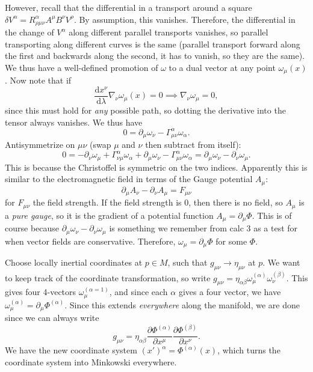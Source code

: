 However, recall that the differential in a transport around a square $\delta V^\alpha =R^\alpha _{\rho \mu \nu } A^\mu B^\nu V^\rho $. By assumption, this vanishes. Therefore, the differential in the change of $V^\alpha $ along different parallel transports vanishes, so parallel transporting along different curves is the same (parallel transport forward along the first and backwards along the second, it has to vanish, so they are the same). We thus have a well-defined promotion of $\omega $ to a dual vector at any point $\omega _\mu (x)$. Now note that if
\[
	\frac{\mathrm{d}x^\nu }{\mathrm{d}\lambda } \nabla _\nu \omega _\mu (x)=0\implies \nabla _\nu \omega _\mu =0
,\]
since this must hold for \emph{any} possible path, so dotting the derivative into the tensor always vanishes. We thus have
\[
	0=\partial _\mu \omega _\nu -\Gamma _{\mu \nu } ^\alpha \omega _\alpha 
.\]
Antisymmetrize on $\mu \nu $ (swap $\mu $ and $\nu $ then subtract from itself):
\[
	0=-\partial _\nu  \omega _\mu +\Gamma _{\nu \mu } ^\alpha \omega _\alpha +\partial _\mu \omega _\nu -\Gamma _{\mu \nu } ^\alpha \omega _\alpha =\partial _{\mu } \omega _\nu -\partial _\nu \omega _\mu 
.\]
This is because the Christoffel is symmetric on the two indices. Apparently this is similar to the electromagnetic field in terms of the Gauge potential $A_\mu $:
\[
	\partial _\mu A_\nu -\partial _\nu A_\mu =F_{\mu \nu } 
\]
for $F_{\mu \nu } $ the field strength. If the field strength is 0, then there is no field, so $A_\mu $ is a \emph{pure gauge}, so it is the gradient of a potential function $A_\mu =\partial _\mu \Phi $. This is of course because $\partial _\mu \omega _\nu -\partial _\nu \omega _\mu $ is something we remember from calc 3 as a test for when vector fields are conservative. Therefore, $\omega _\mu =\partial _\mu \Phi $ for some $\Phi $.

Choose locally inertial coordinates at $p\in M$, such that $g_{\mu \nu } \to \eta _{\mu \nu } $ at $p$. We want to keep track of the coordinate transformation, so write $g_{\mu \nu } =\eta _{\alpha \beta } \omega _\mu ^{(\alpha )} \omega _\nu ^{(\beta )} $. This gives four 4-vectors $\omega_\mu ^{(\alpha =1)} $, and since each $\alpha $ gives a four vector, we have $\omega _\mu ^{(\alpha )} =\partial _\mu \Phi ^{(\alpha )} $. Since this extends \emph{everywhere} along the manifold, we are done since we can always write
\[
	g_{\mu \nu } =\eta _{\alpha \beta } \frac{\partial \Phi ^{(\alpha )} }{\partial x^\mu } \frac{\partial \Phi ^{(\beta )} }{\partial x^\nu } 
.\]
We have the new coordinate system $(x')^\alpha =\Phi ^{(\alpha )} (x)$, which turns the coordinate system into Minkowski everywhere.
